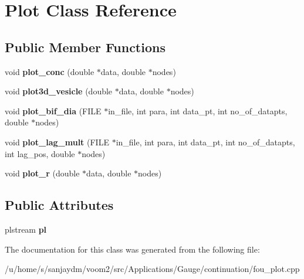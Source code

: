 \hypertarget{class_plot}{
\section{Plot Class Reference}
\label{class_plot}
}
\subsection*{Public Member Functions}
\begin{DoxyCompactItemize}
\item 
\hypertarget{class_plot_a948066a178c7d40659e6a7112b752bd4}{
void {\bfseries plot\_\-conc} (double $\ast$data, double $\ast$nodes)}
\label{class_plot_a948066a178c7d40659e6a7112b752bd4}

\item 
\hypertarget{class_plot_ad5372f1eb08670f0952cca15669cffa4}{
void {\bfseries plot3d\_\-vesicle} (double $\ast$data, double $\ast$nodes)}
\label{class_plot_ad5372f1eb08670f0952cca15669cffa4}

\item 
\hypertarget{class_plot_a70ae4b450a439e4ba9ba74e895d2dc4d}{
void {\bfseries plot\_\-bif\_\-dia} (FILE $\ast$in\_\-file, int para, int data\_\-pt, int no\_\-of\_\-datapts, double $\ast$nodes)}
\label{class_plot_a70ae4b450a439e4ba9ba74e895d2dc4d}

\item 
\hypertarget{class_plot_a2cb0d3da63d6da0d9970efad9bdc0309}{
void {\bfseries plot\_\-lag\_\-mult} (FILE $\ast$in\_\-file, int para, int data\_\-pt, int no\_\-of\_\-datapts, int lag\_\-pos, double $\ast$nodes)}
\label{class_plot_a2cb0d3da63d6da0d9970efad9bdc0309}

\item 
\hypertarget{class_plot_a830bc7a917698919995a3da9c328a1d5}{
void {\bfseries plot\_\-r} (double $\ast$data, double $\ast$nodes)}
\label{class_plot_a830bc7a917698919995a3da9c328a1d5}

\end{DoxyCompactItemize}
\subsection*{Public Attributes}
\begin{DoxyCompactItemize}
\item 
\hypertarget{class_plot_afdb653d5b6a2e0d6d0416f57d2bce899}{
plstream {\bfseries pl}}
\label{class_plot_afdb653d5b6a2e0d6d0416f57d2bce899}

\end{DoxyCompactItemize}


The documentation for this class was generated from the following file:\begin{DoxyCompactItemize}
\item 
/u/home/s/sanjaydm/voom2/src/Applications/Gauge/continuation/fou\_\-plot.cpp\end{DoxyCompactItemize}
